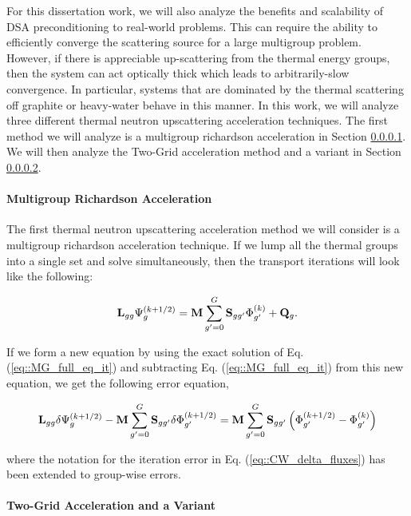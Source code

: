 \documentclass[11pt]{article}
\begin{document}
For this dissertation work, we will also analyze the benefits and scalability of DSA preconditioning to real-world problems. This can require the ability to efficiently converge the scattering source for a large multigroup problem. However, if there is appreciable up-scattering from the thermal energy groups, then the system can act optically thick which leads to arbitrarily-slow convergence. In particular, systems that are dominated by the thermal scattering off graphite or heavy-water behave in this manner. In this work, we will analyze three different thermal neutron upscattering acceleration techniques. The first method we will analyze is a multigroup richardson acceleration in Section \ref{sec::CW_DSA_Upscatter_Rich}. We will then analyze the Two-Grid acceleration method and a variant in Section \ref{sec::CW_DSA_Upscatter_TG}.

\paragraph{Multigroup Richardson Acceleration}
\label{sec::CW_DSA_Upscatter_Rich}

The first thermal neutron upscattering acceleration method we will consider is a multigroup richardson acceleration technique. If we lump all the thermal groups into a single set and solve simultaneously, then the transport iterations will look like the following:

\begin{equation}
\label{eq::MG_full_eq_it}
{\bf L}_{gg} \Psi_g^{(k+1/2)} =  {\bf M} \sum_{g'=0}^G {\bf S}_{g g'} \Phi_{g'}^{(k)} + {\bf Q}_g.
\end{equation}

\noindent If we form a new equation by using the exact solution of Eq. (\ref{eq::MG_full_eq_it}) and subtracting Eq. (\ref{eq::MG_full_eq_it}) from this new equation, we get the following error equation, 

\begin{equation}
\label{eq::MG_full_eq_err}
{\bf L}_{gg} \delta \Psi_g^{(k+1/2)} - {\bf M} \sum_{g'=0}^G {\bf S}_{g g'} \delta \Phi_{g'}^{(k+1/2)}=  {\bf M} \sum_{g'=0}^G {\bf S}_{g g'}\left( \Phi_{g'}^{(k+1/2)}- \Phi_{g'}^{(k)} \right)
\end{equation}

\noindent where the notation for the iteration error in Eq. (\ref{eq::CW_delta_fluxes}) has been extended to group-wise errors.

\paragraph{Two-Grid Acceleration and a Variant}
\label{sec::CW_DSA_Upscatter_TG}
\end{document}
